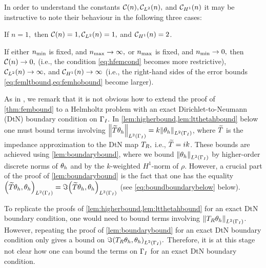 In order to understand the constants $\mathcal C(n), \mathcal C_{L^{2}}(n),$ and $\mathcal C_{H^{1}}(n)$ it may be instructive to note their behaviour in the following three cases:
\bit
\item If $n=1,$ then $\mathcal C(n)=1, \mathcal C_{L^{2}}(n)=1,$ and $\mathcal C_{H^{1}}(n)=2$.
\item If either $n_{\min}$ is fixed, and $n_{\max} \rightarrow \infty,$ or $n_{\max}$ is fixed, and $n_{\min} \rightarrow 0,$ then $\mathcal C(n)\rightarrow 0,$ (i.e., the condition \cref{eq:hfemcond} becomes more restrictive), $\mathcal C_{L^{2}}(n)\rightarrow \infty,$ and $\mathcal C_{H^{1}}(n)\rightarrow \infty$ (i.e., the right-hand sides of the error bounds \cref{eq:femltbound,eq:femhobound} become larger).
  \eit
  \ere

  As in \cite[Remark 5.3(e)]{DuWu:15}, we remark that it is not obvious how to extend the proof of \cref{thm:fembound} to a Helmholtz problem with an exact Dirichlet-to-Neumann (DtN) boundary condition on $\Gamma_{I}.$ In \cref{lem:higherbound,lem:ltthetahbound} below one must bound terms involving $\NLtGI{\DtNapprox\thetah} = k\NLtGI{\thetah}$, where $\widetilde{T}$ is the impedance approximation to the DtN map $T_{R},$ i.e., $\widetilde{T} = ik$. These bounds are achieved using \cref{lem:boundarybound}, where we bound $\NLtGI{\thetah}$ by higher-order discrete norms of $\theta_{h}$ and by the $k$-weighted $H^1$-norm of $\rho.$ However, a crucial part of the proof of \cref{lem:boundarybound} is the fact that one has the equality $\IPLtGI{\DtNapprox\thetah}{\thetah} = \Im \IPLtGI{\DtNapprox \thetah}{\thetah}$ (see \cref{eq:boundboundarybelow} below).

  To replicate the proofs of \cref{lem:higherbound,lem:ltthetahbound} for an exact DtN boundary condition, one would need to bound terms involving $\NLtGI{\DtN \thetah}$. However, repeating the proof of \cref{lem:boundarybound} for an exact DtN boundary condition only gives a bound on $\Im \IPLtGI{\DtN \thetah}{\thetah}.$ Therefore, it is at this stage not clear how one can bound the terms on $\Gamma_{I}$ for an exact DtN boundary condition.
  \ere


